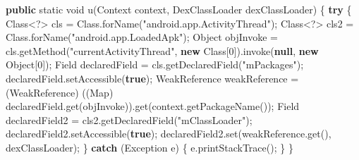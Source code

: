 \documentclass[
]{article}
\newenvironment{Shaded}{}{}
\newcommand{\BuiltInTok}[1]{\textcolor[rgb]{0.00,0.50,0.00}{#1}}
\newcommand{\ControlFlowTok}[1]{\textcolor[rgb]{0.00,0.44,0.13}{\textbf{#1}}}
\newcommand{\DataTypeTok}[1]{\textcolor[rgb]{0.56,0.13,0.00}{#1}}
\newcommand{\DecValTok}[1]{\textcolor[rgb]{0.25,0.63,0.44}{#1}}
\newcommand{\FunctionTok}[1]{\textcolor[rgb]{0.02,0.16,0.49}{#1}}
\newcommand{\KeywordTok}[1]{\textcolor[rgb]{0.00,0.44,0.13}{\textbf{#1}}}
\newcommand{\NormalTok}[1]{#1}
\newcommand{\OperatorTok}[1]{\textcolor[rgb]{0.40,0.40,0.40}{#1}}
\newcommand{\StringTok}[1]{\textcolor[rgb]{0.25,0.44,0.63}{#1}}
\begin{document}
\begin{Shaded}
\begin{Highlighting}[]
    \KeywordTok{public} \DataTypeTok{static} \DataTypeTok{void} \FunctionTok{u}\OperatorTok{(}\BuiltInTok{Context}\NormalTok{ context}\OperatorTok{,}\NormalTok{ DexClassLoader dexClassLoader}\OperatorTok{)} \OperatorTok{\{}
        \ControlFlowTok{try} \OperatorTok{\{}
            \BuiltInTok{Class}\OperatorTok{\textless{}?\textgreater{}}\NormalTok{ cls }\OperatorTok{=} \BuiltInTok{Class}\OperatorTok{.}\FunctionTok{forName}\OperatorTok{(}\StringTok{"android.app.ActivityThread"}\OperatorTok{);}
            \BuiltInTok{Class}\OperatorTok{\textless{}?\textgreater{}}\NormalTok{ cls2 }\OperatorTok{=} \BuiltInTok{Class}\OperatorTok{.}\FunctionTok{forName}\OperatorTok{(}\StringTok{"android.app.LoadedApk"}\OperatorTok{);}
            \BuiltInTok{Object}\NormalTok{ objInvoke }\OperatorTok{=}\NormalTok{ cls}\OperatorTok{.}\FunctionTok{getMethod}\OperatorTok{(}\StringTok{"currentActivityThread"}\OperatorTok{,} \KeywordTok{new} \BuiltInTok{Class}\OperatorTok{[}\DecValTok{0}\OperatorTok{]).}\FunctionTok{invoke}\OperatorTok{(}\KeywordTok{null}\OperatorTok{,} \KeywordTok{new} \BuiltInTok{Object}\OperatorTok{[}\DecValTok{0}\OperatorTok{]);}
            \BuiltInTok{Field}\NormalTok{ declaredField }\OperatorTok{=}\NormalTok{ cls}\OperatorTok{.}\FunctionTok{getDeclaredField}\OperatorTok{(}\StringTok{"mPackages"}\OperatorTok{);}
\NormalTok{            declaredField}\OperatorTok{.}\FunctionTok{setAccessible}\OperatorTok{(}\KeywordTok{true}\OperatorTok{);}
            \BuiltInTok{WeakReference}\NormalTok{ weakReference }\OperatorTok{=} \OperatorTok{(}\BuiltInTok{WeakReference}\OperatorTok{)} \OperatorTok{((}\BuiltInTok{Map}\OperatorTok{)}\NormalTok{ declaredField}\OperatorTok{.}\FunctionTok{get}\OperatorTok{(}\NormalTok{objInvoke}\OperatorTok{)).}\FunctionTok{get}\OperatorTok{(}\NormalTok{context}\OperatorTok{.}\FunctionTok{getPackageName}\OperatorTok{());}
            \BuiltInTok{Field}\NormalTok{ declaredField2 }\OperatorTok{=}\NormalTok{ cls2}\OperatorTok{.}\FunctionTok{getDeclaredField}\OperatorTok{(}\StringTok{"mClassLoader"}\OperatorTok{);}
\NormalTok{            declaredField2}\OperatorTok{.}\FunctionTok{setAccessible}\OperatorTok{(}\KeywordTok{true}\OperatorTok{);}
\NormalTok{            declaredField2}\OperatorTok{.}\FunctionTok{set}\OperatorTok{(}\NormalTok{weakReference}\OperatorTok{.}\FunctionTok{get}\OperatorTok{(),}\NormalTok{ dexClassLoader}\OperatorTok{);}
        \OperatorTok{\}} \ControlFlowTok{catch} \OperatorTok{(}\BuiltInTok{Exception}\NormalTok{ e}\OperatorTok{)} \OperatorTok{\{}
\NormalTok{            e}\OperatorTok{.}\FunctionTok{printStackTrace}\OperatorTok{();}
        \OperatorTok{\}}
    \OperatorTok{\}}


\end{Highlighting}
\end{Shaded}
\end{document}
